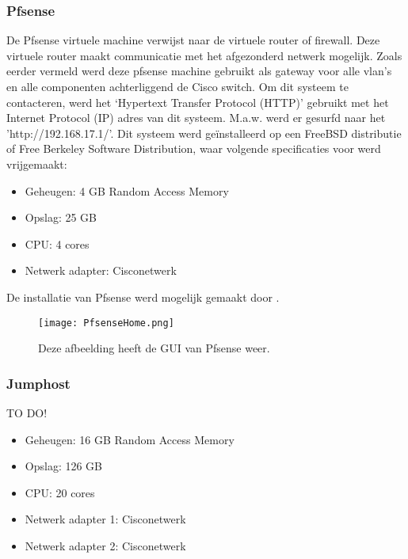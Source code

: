 \subsubsection{Pfsense}
De Pfsense virtuele machine verwijst naar de virtuele router of firewall. Deze virtuele router maakt communicatie met het afgezonderd netwerk mogelijk. Zoals eerder vermeld werd deze pfsense machine gebruikt  als gateway voor alle vlan’s en alle componenten achterliggend de Cisco switch.
\newline
\newline
Om dit systeem te contacteren, werd het ‘Hypertext Transfer Protocol (HTTP)’ gebruikt met het Internet Protocol (IP) adres van dit systeem. M.a.w. werd er gesurfd naar het 'http://192.168.17.1/'.
\newline
\newline
Dit systeem werd geïnstalleerd op een FreeBSD distributie of Free Berkeley Software Distribution, waar volgende specificaties voor werd vrijgemaakt: 

\begin{itemize}
	\item Geheugen: 4 GB Random Access Memory
	\item Opslag: 25 GB
	\item CPU: 4 cores
	\item Netwerk adapter: Cisco\textunderscore netwerk
\end{itemize}
De installatie van Pfsense werd mogelijk gemaakt door \cite{Pfsense_InstallationGuide}.

\begin{figure}[H]
	\centering
	\texttt{[image: PfsenseHome.png]}
	\caption{Deze afbeelding heeft de GUI van Pfsense weer. }
\end{figure}

\subsubsection{Jumphost}
TO DO!

\begin{itemize}
	\item Geheugen: 16 GB Random Access Memory
	\item Opslag: 126 GB
	\item CPU: 20 cores
	\item Netwerk adapter 1: Cisco\textunderscore netwerk
	\item Netwerk adapter 2: Cisco\textunderscore netwerk
\end{itemize}

